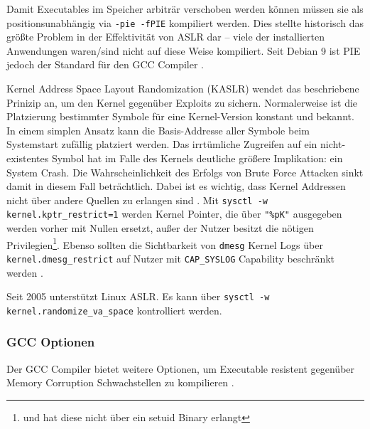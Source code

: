 Damit Executables im Speicher arbiträr verschoben werden können müssen sie als positionsunabhängig via \texttt{-pie -fPIE} kompiliert werden. Dies stellte historisch das größte Problem in der Effektivität von ASLR dar -- viele der installierten Anwendungen waren/sind nicht auf diese Weise kompiliert. Seit Debian 9 ist PIE jedoch der Standard für den GCC Compiler \cite{debian-9}.

Kernel Address Space Layout Randomization (KASLR) wendet das beschriebene Prinizip an, um den Kernel gegenüber Exploits zu sichern. Normalerweise ist die Platzierung bestimmter Symbole für eine Kernel-Version konstant und bekannt. In einem simplen Ansatz kann die Basis-Addresse aller Symbole beim Systemstart zufällig platziert werden. Das irrtümliche Zugreifen auf ein nicht-existentes Symbol hat im Falle des Kernels deutliche größere Implikation: ein System Crash. Die Wahrscheinlichkeit
des Erfolgs von Brute Force Attacken sinkt damit in diesem Fall beträchtlich. Dabei ist es wichtig, dass Kernel Addressen nicht über andere Quellen zu erlangen sind \cite{lwn-kaslr}. Mit \texttt{sysctl -w kernel.kptr\_restrict=1}  werden Kernel Pointer, die über \texttt{"\%pK"} ausgegeben werden vorher mit Nullen ersetzt, außer der Nutzer besitzt die nötigen Privilegien\footnote{und hat diese nicht über ein setuid Binary erlangt}. Ebenso sollten die Sichtbarkeit von \texttt{dmesg} Kernel Logs
über \texttt{kernel.dmesg\_restrict} auf Nutzer mit \texttt{CAP\_SYSLOG} Capability beschränkt werden \cite{sysctl-kernel}.

Seit 2005 unterstützt Linux ASLR. Es kann über \texttt{sysctl -w kernel.randomize\_va\_space} kontrolliert werden.

\subsubsection{GCC Optionen}

Der GCC Compiler bietet weitere Optionen, um Executable resistent gegenüber Memory Corruption Schwachstellen zu kompilieren \cite{deb-hardening}.

